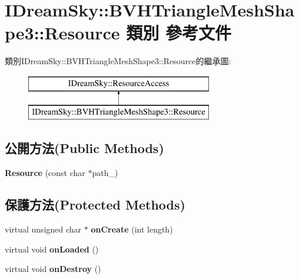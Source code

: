 \hypertarget{class_i_dream_sky_1_1_b_v_h_triangle_mesh_shape3_1_1_resource}{}\section{I\+Dream\+Sky\+:\+:B\+V\+H\+Triangle\+Mesh\+Shape3\+:\+:Resource 類別 參考文件}
\label{class_i_dream_sky_1_1_b_v_h_triangle_mesh_shape3_1_1_resource}
類別\+I\+Dream\+Sky\+:\+:B\+V\+H\+Triangle\+Mesh\+Shape3\+:\+:Resource的繼承圖\+:\begin{figure}[H]
\begin{center}
\leavevmode
\includegraphics[height=2.000000cm]{class_i_dream_sky_1_1_b_v_h_triangle_mesh_shape3_1_1_resource}
\end{center}
\end{figure}
\subsection*{公開方法(Public Methods)}
\begin{DoxyCompactItemize}
\item 
{\bfseries Resource} (const char $\ast$path\+\_\+)\hypertarget{class_i_dream_sky_1_1_b_v_h_triangle_mesh_shape3_1_1_resource_a394afca7fe309f0f99d0eae11843700b}{}\label{class_i_dream_sky_1_1_b_v_h_triangle_mesh_shape3_1_1_resource_a394afca7fe309f0f99d0eae11843700b}

\end{DoxyCompactItemize}
\subsection*{保護方法(Protected Methods)}
\begin{DoxyCompactItemize}
\item 
virtual unsigned char $\ast$ {\bfseries on\+Create} (int length)\hypertarget{class_i_dream_sky_1_1_b_v_h_triangle_mesh_shape3_1_1_resource_a48dd2f334d28b5aea622830961e0eb48}{}\label{class_i_dream_sky_1_1_b_v_h_triangle_mesh_shape3_1_1_resource_a48dd2f334d28b5aea622830961e0eb48}

\item 
virtual void {\bfseries on\+Loaded} ()\hypertarget{class_i_dream_sky_1_1_b_v_h_triangle_mesh_shape3_1_1_resource_a474438eff3a975670cd3dbd43688ae16}{}\label{class_i_dream_sky_1_1_b_v_h_triangle_mesh_shape3_1_1_resource_a474438eff3a975670cd3dbd43688ae16}

\item 
virtual void {\bfseries on\+Destroy} ()\hypertarget{class_i_dream_sky_1_1_b_v_h_triangle_mesh_shape3_1_1_resource_a138489fae41a9e7eb6d6cd1a3c1aff25}{}\label{class_i_dream_sky_1_1_b_v_h_triangle_mesh_shape3_1_1_resource_a138489fae41a9e7eb6d6cd1a3c1aff25}

\end{DoxyCompactItemize}
